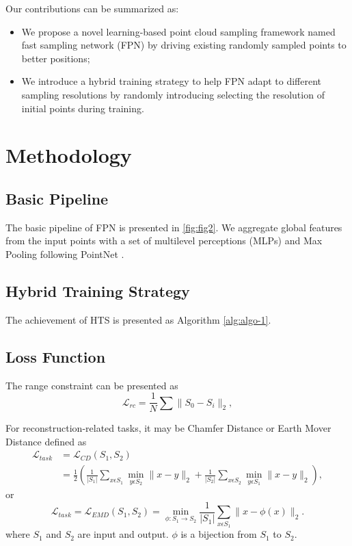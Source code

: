 \documentclass[a4paper,10pt]{article}
\begin{document}
\begin{multicols}{2}
Our contributions can be summarized as:
\begin{itemize}
 \item We propose a novel learning-based point cloud sampling framework named fast sampling network (FPN) by driving existing randomly sampled points to better positions;
 \item We introduce a hybrid training strategy to help FPN adapt to different sampling resolutions by randomly introducing selecting the resolution of initial points during training.
\end{itemize}


\section{Methodology}
\subsection{Basic Pipeline}
The basic pipeline of FPN is presented in \autoref{fig:fig2}. We aggregate global features from the input points with a set of multilevel perceptions (MLPs) and Max Pooling following PointNet \cite{qi2017pointnet}.

\subsection{Hybrid Training Strategy}
The achievement of HTS is presented as Algorithm \autoref{alg:algo-1}.

\subsection{Loss Function}
The range constraint can be presented as
\begin{equation}
 \mathcal{L}_{rc} = \frac{1}{N}\sum \|S_0 - S_i\|_2,
\end{equation}

For reconstruction-related tasks, it may be Chamfer Distance or Earth Mover Distance \cite{fan2017point} deﬁned as
\begin{equation} \label{eqn:eqn1}
\begin{split}
\mathcal{L}_{task} & = \mathcal{L}_{CD}(S_1, S_2) \\
& = \frac{1}{2} \left (\frac{1}{|S_1|}\sum_{x \epsilon S_1}\min_{y \epsilon S_2} \|x-y\|_2 + \frac{1}{|S_2|}\sum_{x \epsilon S_2}\min_{y \epsilon S_1} \|x-y\|_2 \right ),
\end{split}
\end{equation}
or
\begin{equation}
 \mathcal{L}_{task} = \mathcal{L}_{EMD}(S_1, S_2) = \min_{\phi : S_1 \rightarrow S_2} \frac{1}{|S_1|}\sum_{x \epsilon S_1} \|x-\phi(x) \|_2.
\end{equation}
where $S_1$ and $S_2$ are input and output. $\phi$ is a bijection from $S_1$ to $S_2$.


\end{multicols}
\end{document}
